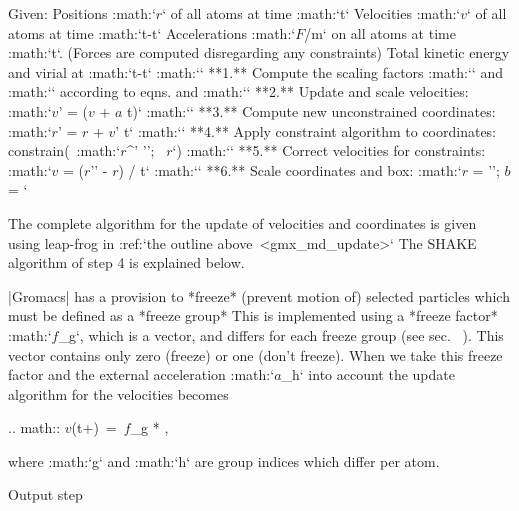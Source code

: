 { 
 Given:
 Positions :math:`{\mbox{\boldmath ${r}$}}` of all atoms at time
 :math:`t`
 Velocities :math:`{\mbox{\boldmath ${v}$}}` of all atoms at time
 :math:`t-{{}{{\Delta t}}}`
 Accelerations :math:`{\mbox{\boldmath ${F}$}}/m` on all atoms at time
 :math:`t`.
 (Forces are computed disregarding any constraints)
 Total kinetic energy and virial at :math:`t-{{\Delta t}}`
 :math:`\Downarrow`
 **1.** Compute the scaling factors :math:`\lambda` and :math:`\mu`
 according to eqns.
 and
 :math:`\Downarrow`
 **2.** Update and scale velocities:
 :math:`{\mbox{\boldmath ${v}$}}' =  \lambda ({\mbox{\boldmath ${v}$}} +
 {\mbox{\boldmath ${a}$}} \Delta t)`
 :math:`\Downarrow`
 **3.** Compute new unconstrained coordinates:
 :math:`{\mbox{\boldmath ${r}$}}' = {\mbox{\boldmath ${r}$}} + {\mbox{\boldmath ${v}$}}'
 \Delta t`
 :math:`\Downarrow`
 **4.** Apply constraint algorithm to coordinates:
 constrain(\ :math:`{\mbox{\boldmath ${r}$}}^{'} '';
 \,  {\mbox{\boldmath ${r}$}}`)
 :math:`\Downarrow`
 **5.** Correct velocities for constraints:
 :math:`{\mbox{\boldmath ${v}$}} = ({\mbox{\boldmath ${r}$}}'' -
 {\mbox{\boldmath ${r}$}}) / \Delta t`
 :math:`\Downarrow`
 **6.** Scale coordinates and box:
 :math:`{\mbox{\boldmath ${r}$}} = ''; {\mbox{\boldmath ${b}$}} =
 `

The complete algorithm for the update of velocities and coordinates is
given using leap-frog in :ref:`the outline above <gmx_md_update>`
The SHAKE algorithm of step 4 is explained below.

|Gromacs| has a provision to *freeze* (prevent motion of) selected
particles
which must be defined as a
*freeze group*
This is implemented using a *freeze factor*
:math:`{\mbox{\boldmath ${f}$}}_g`, which is a vector, and differs for
each freeze group (see sec. 
). This
vector contains only zero (freeze) or one (don’t freeze). When we take
this freeze factor and the external acceleration
:math:`{\mbox{\boldmath ${a}$}}_h` into account the update algorithm for
the velocities becomes

.. math:: {\mbox{\boldmath ${v}$}}(t+{})~=~{\mbox{\boldmath ${f}$}}_g * \lambda * ,

where :math:`g` and :math:`h` are group indices which differ per atom.

Output step
~~~~~~~~~~~

}
